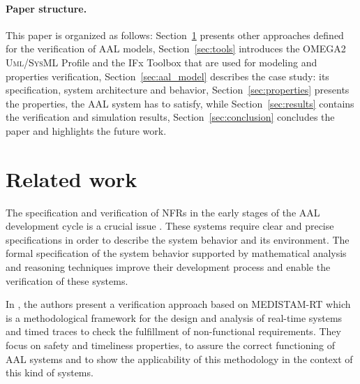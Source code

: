 \documentclass[a4paper,twoside]{article}
\def\myrelax{\textsc{Relax}}                  %
\def\UML{\textsc{Uml}}
\def\SysML{\textsc{SysML}}
\begin{document}

\paragraph*{Paper structure.} This paper is organized as follows: Section~\ref{sec:r_work} presents other approaches defined for the verification of AAL models, Section~\ref{sec:tools} introduces the OMEGA2 \UML{}/\SysML{} Profile and the IFx Toolbox that are used for modeling and properties verification, Section~\ref{sec:aal_model} describes the case study: its specification, system architecture and behavior, Section~\ref{sec:properties} presents the properties, the AAL system has to satisfy, while Section~\ref{sec:results} contains the verification and simulation results, Section~\ref{sec:conclusion} concludes the paper and highlights the future work.

\section{Related work}
\label{sec:r_work}

The specification and verification of NFRs in the early stages of the AAL development cycle is a crucial issue \cite{test9}. These systems require clear and precise specifications in order to describe the system behavior and its environment. The formal specification of the system behavior supported by mathematical analysis and reasoning techniques improve their development process and enable the verification of these systems. 

In \cite{test10}, the authors present a verification approach based on MEDISTAM-RT which is a methodological framework for the design and analysis of real-time systems and timed traces to check the fulfillment of non-functional requirements. They focus on  safety and timeliness properties, to assure the correct functioning of AAL systems and to show the applicability of this methodology in the context of this kind of systems. 
\end{document}
